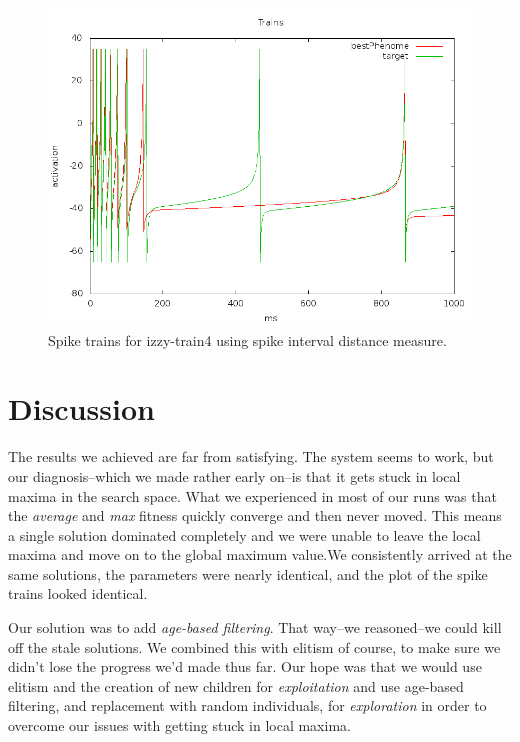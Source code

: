\documentclass[a4paper]{article}
\begin{document}
\begin{figure}[htb!]
  \centering
  \includegraphics[width=\textwidth]{Waveform-izzy4-trains-plot.png}
  \caption{Spike trains for izzy-train4 using spike interval distance measure.}
\end{figure}

\newpage
\section{Discussion}
\label{sec:discussion}

The results we achieved are far from satisfying. The system seems to work, but our diagnosis--which we made rather early on--is that it gets stuck in local maxima in the search space. What we experienced in most of our runs was that the \textit{average} and \textit{max} fitness quickly converge and then never moved. This means a single solution dominated completely and we were unable to leave the local maxima and move on to the global maximum value.We consistently arrived at the same solutions, the parameters were nearly identical, and the plot of the spike trains looked identical.

Our solution was to add \textit{age-based filtering}. That way--we reasoned--we could kill off the stale solutions. We combined this with elitism of course, to make sure we didn't lose the progress we'd made thus far. Our hope was that we would use elitism and the creation of new children for \textit{exploitation} and use age-based filtering, and replacement with random individuals, for \textit{exploration} in order to  overcome our issues with getting stuck in local maxima.
\end{document}
